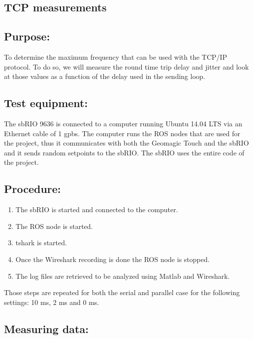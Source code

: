 \subsection{TCP measurements}\label{sec_tcp_mes}

\subsection*{Purpose:}

To determine the maximum frequency that can be used with the TCP/IP protocol. To do so, we will measure the round time trip delay and jitter and look at those values as a function of the delay used in the sending loop.

\subsection*{Test equipment:}

The sbRIO 9636 is connected to a computer running Ubuntu 14.04 LTS via an Ethernet cable of 1 gpbs. The computer runs the ROS nodes that are used for the project, thus it communicates with both the Geomagic Touch and the sbRIO and it sends random setpoints to the sbRIO. The sbRIO uses the entire code of the project.

\subsection*{Procedure:}

\begin{enumerate}
	\item The sbRIO is started and connected to the computer.
	\item The ROS node is started.
	\item tshark is started.%
	\item Once the Wireshark recording is done the ROS node is stopped.
	\item The log files are retrieved to be analyzed using Matlab and Wireshark.
\end{enumerate}
Those steps are repeated for both the serial and parallel case for the following settings: 10 ms, 2 ms and 0 ms.


\subsection*{Measuring data:}

